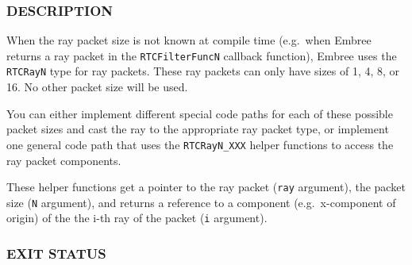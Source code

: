 \begin{Shaded}
\begin{Highlighting}[]
\OperatorTok{\&}\OperatorTok{(}\OperatorTok{*}\OperatorTok{,}  \OperatorTok{,}  \OperatorTok{);}
 \OperatorTok{\&}\OperatorTok{(}\OperatorTok{*}\OperatorTok{,}  \OperatorTok{,}  \OperatorTok{);}
 \OperatorTok{\&}\OperatorTok{(}\OperatorTok{*}\OperatorTok{,}  \OperatorTok{,}  \OperatorTok{);}
 \OperatorTok{\&}\OperatorTok{(}\OperatorTok{*}\OperatorTok{,}  \OperatorTok{,}  \OperatorTok{);}
\end{Highlighting}
\end{Shaded}

\subsubsection{DESCRIPTION}\label{description}

When the ray packet size is not known at compile time (e.g.~when Embree
returns a ray packet in the \texttt{RTCFilterFuncN} callback function),
Embree uses the \texttt{RTCRayN} type for ray packets. These ray packets
can only have sizes of 1, 4, 8, or 16. No other packet size will be
used.

You can either implement different special code paths for each of these
possible packet sizes and cast the ray to the appropriate ray packet
type, or implement one general code path that uses the
\texttt{RTCRayN\_XXX} helper functions to access the ray packet
components.

These helper functions get a pointer to the ray packet (\texttt{ray}
argument), the packet size (\texttt{N} argument), and returns a
reference to a component (e.g.~x-component of origin) of the the i-th
ray of the packet (\texttt{i} argument).

\subsubsection{EXIT STATUS}\label{exit-status}

